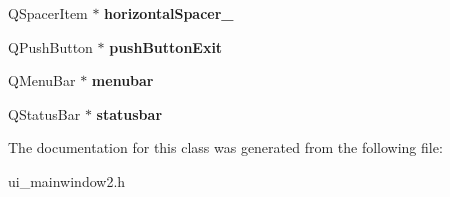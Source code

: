 \begin{DoxyCompactItemize}
\item 
\hypertarget{classUi__MainWindow2_adbfcd2f28c84a157fe7fb86ebeb20944}{Q\-Spacer\-Item $\ast$ {\bfseries horizontal\-Spacer\-\_}}\label{classUi__MainWindow2_adbfcd2f28c84a157fe7fb86ebeb20944}

\item 
\hypertarget{classUi__MainWindow2_ae43f8c71332774fe9b15bc101b8afc04}{Q\-Push\-Button $\ast$ {\bfseries push\-Button\-Exit}}\label{classUi__MainWindow2_ae43f8c71332774fe9b15bc101b8afc04}

\item 
\hypertarget{classUi__MainWindow2_adf2fa7a874107102390fdc62d94d8bf5}{Q\-Menu\-Bar $\ast$ {\bfseries menubar}}\label{classUi__MainWindow2_adf2fa7a874107102390fdc62d94d8bf5}

\item 
\hypertarget{classUi__MainWindow2_a9b399d52ba4fc0a192094dd9d6c26a6f}{Q\-Status\-Bar $\ast$ {\bfseries statusbar}}\label{classUi__MainWindow2_a9b399d52ba4fc0a192094dd9d6c26a6f}

\end{DoxyCompactItemize}


The documentation for this class was generated from the following file\-:\begin{DoxyCompactItemize}
\item 
ui\-\_\-mainwindow2.\-h\end{DoxyCompactItemize}
